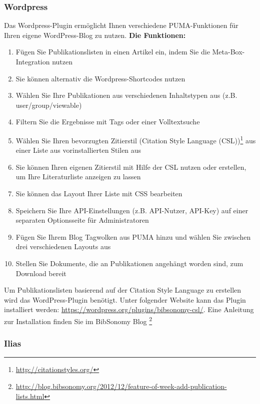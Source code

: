 \documentclass[b5paper,11pt,twoside]{scrbook} %
\begin{document}
\subsubsection{Wordpress}
Das Wordpress-Plugin ermöglicht Ihnen verschiedene PUMA-Funktionen für Ihren eigene WordPress-Blog zu nutzen.\newline\newline
\textbf{Die Funktionen:}
\begin{enumerate}
   \item Fügen Sie Publikationslisten in einen Artikel ein, indem Sie die Meta-Box-Integration nutzen
    \item Sie können alternativ die Wordpress-Shortcodes nutzen
    \item Wählen Sie Ihre Publikationen aus verschiedenen Inhaltstypen aus (z.B. user/group/viewable)
    \item Filtern Sie die Ergebnisse mit Tags oder einer Volltextsuche
    \item Wählen Sie Ihren bevorzugten Zitierstil (Citation Style Language (CSL))\footnote{\url{ http://citationstyles.org/}}  aus einer Liste aus vorinstallierten Stilen aus
    \item Sie können Ihren eigenen Zitierstil mit Hilfe der CSL nutzen oder erstellen, um Ihre Literaturliste anzeigen zu lassen
    \item Sie können das Layout Ihrer Liste mit CSS bearbeiten
    \item Speichern Sie Ihre API-Einstellungen (z.B. API-Nutzer, API-Key) auf einer separaten Optionsseite für Administratoren
    \item Fügen Sie Ihrem Blog Tagwolken aus PUMA hinzu und wählen Sie zwischen drei verschiedenen Layouts aus
    \item Stellen Sie Dokumente, die an Publikationen angehängt worden sind, zum Download bereit
\end{enumerate} 
Um Publikationslisten basierend auf der Citation Style Language zu erstellen wird das WordPress-Plugin benötigt. Unter folgender Website kann das Plugin installiert werden: \url{https://wordpress.org/plugins/bibsonomy-csl/}. Eine Anleitung zur Installation finden Sie im BibSonomy Blog \footnote{\url{http://blog.bibsonomy.org/2012/12/feature-of-week-add-publication-lists.html}}
\subsubsection{Ilias}
\end{document}
